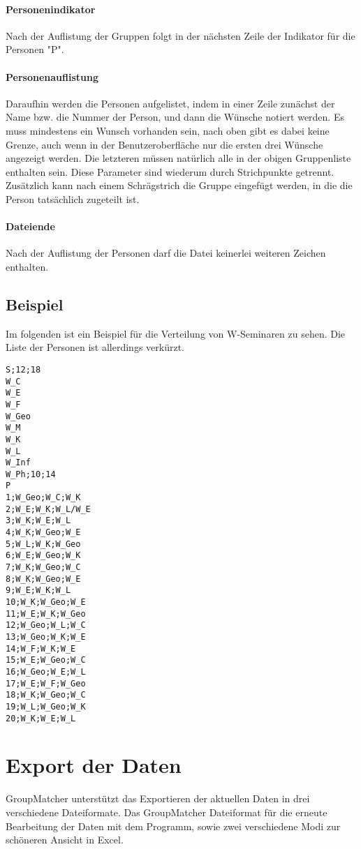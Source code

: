 \documentclass[a4paper,11pt]{article}
\begin{document}
\paragraph{Personenindikator}
Nach der Auflistung der Gruppen folgt in der nächsten Zeile der Indikator für die Personen "P".
\paragraph{Personenauflistung}
Daraufhin werden die Personen aufgelistet, indem in einer Zeile zunächst der Name bzw. die Nummer der Person, und dann die Wünsche notiert werden. Es muss mindestens ein Wunsch vorhanden sein, nach oben gibt es dabei keine Grenze, auch wenn in der Benutzeroberfläche nur die ersten drei Wünsche angezeigt werden. Die letzteren müssen natürlich alle in der obigen Gruppenliste enthalten sein. Diese Parameter sind wiederum durch Strichpunkte getrennt. Zusätzlich kann nach einem Schrägstrich die Gruppe eingefügt werden, in die die Person tatsächlich zugeteilt ist.
\paragraph{Dateiende}
Nach der Auflistung der Personen darf die Datei keinerlei weiteren Zeichen enthalten.
\subsection{Beispiel}
\label{ssec:input-example}
Im folgenden ist ein Beispiel für die Verteilung von W-Seminaren zu sehen. Die Liste der Personen ist allerdings verkürzt.
\begin{lstlisting}
S;12;18
W_C
W_E
W_F
W_Geo
W_M
W_K
W_L
W_Inf
W_Ph;10;14
P
1;W_Geo;W_C;W_K
2;W_E;W_K;W_L/W_E
3;W_K;W_E;W_L
4;W_K;W_Geo;W_E
5;W_L;W_K;W_Geo
6;W_E;W_Geo;W_K
7;W_K;W_Geo;W_C
8;W_K;W_Geo;W_E
9;W_E;W_K;W_L
10;W_K;W_Geo;W_E
11;W_E;W_K;W_Geo
12;W_Geo;W_L;W_C
13;W_Geo;W_K;W_E
14;W_F;W_K;W_E
15;W_E;W_Geo;W_C
16;W_Geo;W_E;W_L
17;W_E;W_F;W_Geo
18;W_K;W_Geo;W_C
19;W_L;W_Geo;W_K
20;W_K;W_E;W_L
\end{lstlisting}


\section{Export der Daten}
\label{sec:export}

GroupMatcher unterstützt das Exportieren der aktuellen Daten in drei verschiedene Dateiformate. Das GroupMatcher Dateiformat für die erneute Bearbeitung der Daten mit dem Programm, sowie zwei verschiedene Modi zur schöneren Ansicht in Excel.
\end{document}
